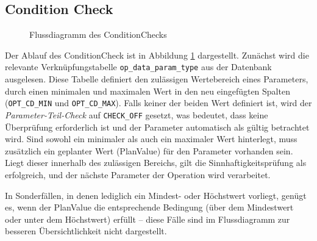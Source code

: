 \subsection{Condition Check}
\begin{figure}[!htb]
    \centering
    \caption{Flussdiagramm des \gls{ConditionCheck}s}
    \label{fig:condition-check}
\end{figure}

Der Ablauf des \gls{ConditionCheck} ist in Abbildung \ref{fig:condition-check} dargestellt. Zunächst wird die relevante Verknüpfungstabelle \texttt{op\_data\_param\_type} aus der Datenbank ausgelesen. Diese Tabelle definiert den zulässigen Wertebereich eines Parameters, durch einen minimalen und maximalen Wert in den neu eingefügten Spalten (\texttt{OPT\_CD\_MIN} und \texttt{OPT\_CD\_MAX}). Falls keiner der beiden Wert definiert ist, wird der \textit{Parameter-Teil-Check} auf \texttt{CHECK\_OFF} gesetzt, was bedeutet, dass keine Überprüfung erforderlich ist und der Parameter automatisch als gültig betrachtet wird. Sind sowohl ein minimaler als auch ein maximaler Wert hinterlegt, muss zusätzlich ein geplanter Wert (PlanValue) für den Parameter vorhanden sein. Liegt dieser innerhalb des zulässigen Bereichs, gilt die Sinnhaftigkeitsprüfung als erfolgreich, und der nächste Parameter der Operation wird verarbeitet. 

In Sonderfällen, in denen lediglich ein Mindest- oder Höchstwert vorliegt, genügt es, wenn der PlanValue die entsprechende Bedingung (über dem Mindestwert oder unter dem Höchstwert) erfüllt – diese Fälle sind im Flussdiagramm zur besseren Übersichtlichkeit nicht dargestellt.



